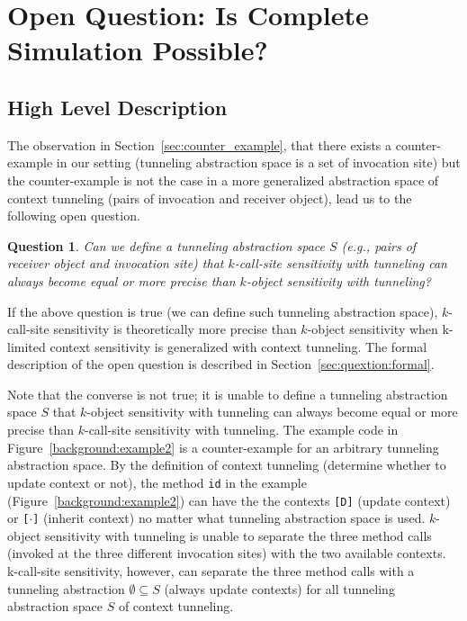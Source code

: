\clearpage
\newtheorem{openquestion}{Question}

\section{Open Question: Is Complete Simulation Possible?}

\subsection{High Level Description}

The observation in Section~\ref{sec:counter_example}, that there exists
a counter-example in our setting (tunneling abstraction space is a set
of invocation site) but the counter-example is not the case in a more
generalized abstraction space of context tunneling (pairs of
invocation and receiver object), lead us to the following open question.
\begin{openquestion}\label{openQ}
Can we define a tunneling abstraction space $S$ (e.g., pairs of receiver
object and invocation site) that $k$-call-site sensitivity with
tunneling can always become equal or more precise than $k$-object
sensitivity with tunneling?
\end{openquestion}
If the above question is true (we can define such tunneling
abstraction space), $k$-call-site sensitivity is theoretically more
precise than $k$-object sensitivity when k-limited context sensitivity
is generalized with context tunneling. The formal description of the
open question is described in Section~\ref{sec:quextion:formal}. 


Note that the converse is not true; it is unable to define a tunneling
abstraction space $S$ that $k$-object sensitivity with
tunneling can always become equal or more precise than $k$-call-site
sensitivity with tunneling. The example code in
Figure~\ref{background:example2} is a counter-example for an arbitrary
tunneling abstraction space. By the definition of context tunneling
(determine whether to update context or not), the method
{\tt id} in the example (Figure~\ref{background:example2}) can have
the the contexts \texttt{[D]} (update context) or \texttt{[$\cdot$]}
(inherit context) no matter what tunneling abstraction space is
used. $k$-object sensitivity with tunneling is unable to separate the
three method calls (invoked at the three different invocation sites)
with the two 
available contexts. k-call-site sensitivity, however, can separate the
three method calls with a tunneling abstraction $\emptyset \subseteq
S$ (always update contexts) for all tunneling abstraction space
$S$ of context tunneling. 


